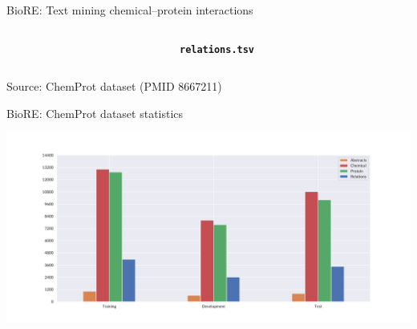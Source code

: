 \begin{frame}[t]{BioRE: Text mining chemical--protein interactions}
\begin{columns}[t,totalwidth=\textwidth]
\begin{column}{0.50\textwidth}
\end{column}

\begin{column}{0.40\textwidth}

\begingroup\minorscriptsize
\textbf{\texttt{relations.tsv}}\\
\smallskip
\setlength{\fboxrule}{0.4pt}
\setlength{\fboxsep}{4pt}
\minortiny%
\endgroup

\end{column}

\end{columns}

\vspace*{1mm}

\flushleft
\fontsize{5pt}{6pt}\selectfont
Source: ChemProt dataset (PMID 8667211)

\end{frame}
\begin{frame}[t]{BioRE: ChemProt dataset statistics}

\centering


\includegraphics[width=\textwidth,trim={36mm 14mm 40mm 20mm},clip]{img/chemprot-dataset-statistics/v3/001.pdf}%

\end{frame}
